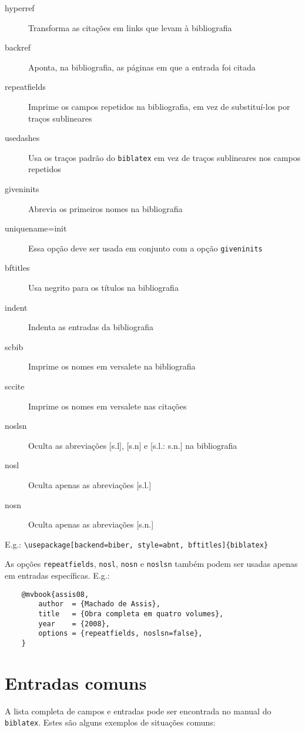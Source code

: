 \documentclass[a4paper]{article}
\begin{document}
\begin{description}
    \item [hyperref] Transforma as citações em links que levam à bibliografia
    \item [backref] Aponta, na bibliografia, as páginas em que a entrada foi citada
    \item [repeatfields] Imprime os campos repetidos na bibliografia, em vez de substituí-los por traços sublineares
    \item [usedashes] Usa os traços padrão do \texttt{biblatex} em vez de traços sublineares nos campos repetidos
    \item [giveninits] Abrevia os primeiros nomes na bibliografia
    \item [uniquename=init] Essa opção deve ser usada em conjunto com a opção \texttt{giveninits}
    \item [bftitles] Usa negrito para os títulos na bibliografia
    \item [indent] Indenta as entradas da bibliografia
    \item [scbib] Imprime os nomes em versalete na bibliografia
    \item [sccite] Imprime os nomes em versalete nas citações
    \item [noslsn] Oculta as abreviações [s.l], [s.n] e [s.l.: s.n.] na bibliografia
    \item [nosl] Oculta apenas as abreviações [s.l.]
    \item [nosn] Oculta apenas as abreviações [s.n.]
\end{description}

E.g.: \verb"\usepackage[backend=biber, style=abnt, bftitles]{biblatex}"

As opções \texttt{repeatfields}, \texttt{nosl}, \texttt{nosn} e \texttt{noslsn} também podem ser usadas apenas em entradas específicas. E.g.:

\begin{verbatim}
    @mvbook{assis08,
        author  = {Machado de Assis},
        title   = {Obra completa em quatro volumes},
        year    = {2008},
        options = {repeatfields, noslsn=false},
    }
\end{verbatim}



\clearpage
\section{Entradas comuns}

A lista completa de campos e entradas pode ser encontrada no manual do \texttt{biblatex}. Estes são alguns exemplos de situações comuns:
\end{document}

